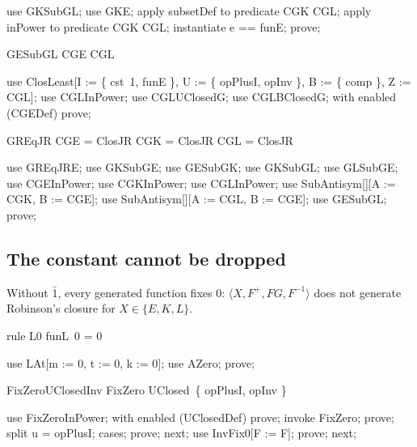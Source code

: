 \documentclass{article}
\begin{document}
\begin{zproof}
use GKSubGL;
use GKE;
apply subsetDef to predicate CGK \subseteq CGL;
apply inPower to predicate CGK \in \power CGL;
instantiate e == funE;
prove;
\end{zproof}

\begin{theorem}{GESubGL}
  CGE \subseteq CGL
\end{theorem}

\begin{zproof}
use ClosLeast[I := \{ cst~1, funE \}, U := \{ opPlusI, opInv \}, B := \{ comp \}, Z := CGL];
use CGLInPower;
use CGLUClosedG;
use CGLBClosedG;
with enabled (CGEDef) prove;
\end{zproof}


\begin{theorem}{GREqJR}
  CGE = ClosJR \land CGK = ClosJR \land CGL = ClosJR
\end{theorem}

\begin{zproof}
use GREqJRE;
use GKSubGE;
use GESubGK;
use GKSubGL;
use GLSubGE;
use CGEInPower;
use CGKInPower;
use CGLInPower;
use SubAntisym[\nat \fun \nat][A := CGK, B := CGE];
use SubAntisym[\nat \fun \nat][A := CGL, B := CGE];
use GESubGL;
prove;
\end{zproof}

\subsection{The constant cannot be dropped}

Without $\bar 1$, every generated function fixes $0$: $\langle X, F^+, FG, F^{-1}\rangle$ does not
generate Robinson's closure for $X \in \{E, K, L\}$.

\begin{theorem}{rule L0}
  funL~0 = 0
\end{theorem}

\begin{zproof}
use LAt[m := 0, t := 0, k := 0];
use AZero;
prove;
\end{zproof}

\begin{theorem}{FixZeroUClosedInv}
  FixZero \in UClosed~\{ opPlusI, opInv \}
\end{theorem}

\begin{zproof}
use FixZeroInPower;
with enabled (UClosedDef) prove;
invoke FixZero;
prove;
split u = opPlusI;
cases;
prove;
next;
use InvFix0[F := F];
prove;
next;
\end{zproof}
\end{document}
